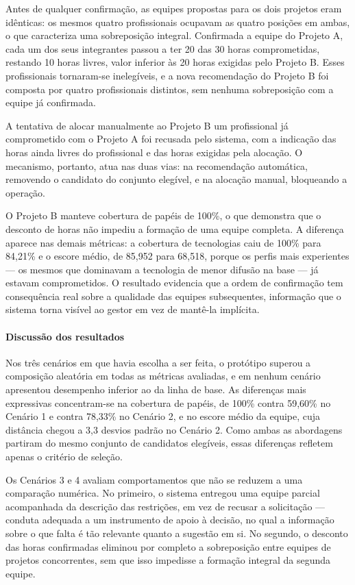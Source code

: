 Antes de qualquer confirmação, as equipes propostas para os dois projetos eram idênticas: os mesmos quatro profissionais ocupavam as quatro posições em ambas, o que caracteriza uma sobreposição integral. Confirmada a equipe do Projeto A, cada um dos seus integrantes passou a ter 20 das 30 horas comprometidas, restando 10 horas livres, valor inferior às 20 horas exigidas pelo Projeto B. Esses profissionais tornaram-se inelegíveis, e a nova recomendação do Projeto B foi composta por quatro profissionais distintos, sem nenhuma sobreposição com a equipe já confirmada.

A tentativa de alocar manualmente ao Projeto B um profissional já comprometido com o Projeto A foi recusada pelo sistema, com a indicação das horas ainda livres do profissional e das horas exigidas pela alocação. O mecanismo, portanto, atua nas duas vias: na recomendação automática, removendo o candidato do conjunto elegível, e na alocação manual, bloqueando a operação.

O Projeto B manteve cobertura de papéis de 100\%, o que demonstra que o desconto de horas não impediu a formação de uma equipe completa. A diferença aparece nas demais métricas: a cobertura de tecnologias caiu de 100\% para 84,21\% e o escore médio, de 85,952 para 68,518, porque os perfis mais experientes — os mesmos que dominavam a tecnologia de menor difusão na base — já estavam comprometidos. O resultado evidencia que a ordem de confirmação tem consequência real sobre a qualidade das equipes subsequentes, informação que o sistema torna visível ao gestor em vez de mantê-la implícita.

\paragraph{Discussão dos resultados}

Nos três cenários em que havia escolha a ser feita, o protótipo superou a composição aleatória em todas as métricas avaliadas, e em nenhum cenário apresentou desempenho inferior ao da linha de base. As diferenças mais expressivas concentram-se na cobertura de papéis, de 100\% contra 59,60\% no Cenário 1 e contra 78,33\% no Cenário 2, e no escore médio da equipe, cuja distância chegou a 3,3 desvios padrão no Cenário 2. Como ambas as abordagens partiram do mesmo conjunto de candidatos elegíveis, essas diferenças refletem apenas o critério de seleção.

Os Cenários 3 e 4 avaliam comportamentos que não se reduzem a uma comparação numérica. No primeiro, o sistema entregou uma equipe parcial acompanhada da descrição das restrições, em vez de recusar a solicitação — conduta adequada a um instrumento de apoio à decisão, no qual a informação sobre o que falta é tão relevante quanto a sugestão em si. No segundo, o desconto das horas confirmadas eliminou por completo a sobreposição entre equipes de projetos concorrentes, sem que isso impedisse a formação integral da segunda equipe.

